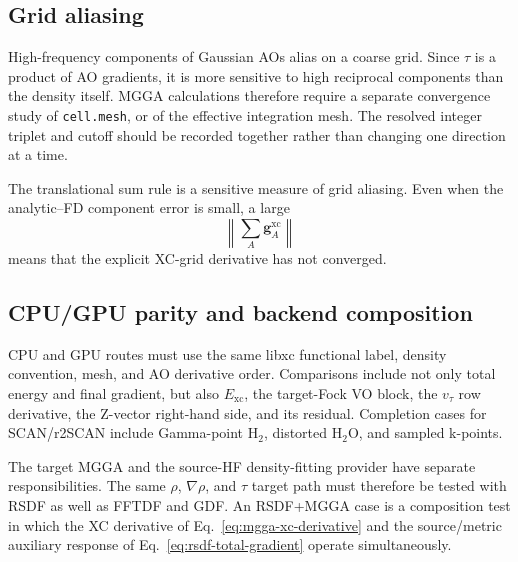 \subsection{Grid aliasing}

High-frequency components of Gaussian AOs alias on a coarse grid.  Since
$\tau$ is a product of AO gradients, it is more sensitive to high reciprocal
components than the density itself.  MGGA calculations therefore require a
separate convergence study of \texttt{cell.mesh}, or of the effective
integration mesh.  The resolved integer triplet and cutoff should be recorded
together rather than changing one direction at a time.

The translational sum rule is a sensitive measure of grid aliasing.  Even when
the analytic--FD component error is small, a large
\begin{equation}
  \left\|\sum_A\mathbf g_A^{\mathrm{xc}}\right\|
  \label{eq:mgga-xc-translation}
\end{equation}
means that the explicit XC-grid derivative has not converged.

\subsection{CPU/GPU parity and backend composition}

CPU and GPU routes must use the same libxc functional label, density
convention, mesh, and AO derivative order.  Comparisons include not only total
energy and final gradient, but also $E_{\mathrm{xc}}$, the target-Fock VO
block, the $v_\tau$ row derivative, the Z-vector right-hand side, and its
residual.  Completion cases for SCAN/r2SCAN include Gamma-point H$_2$,
distorted H$_2$O, and sampled k-points.

The target MGGA and the source-HF density-fitting provider have separate
responsibilities.  The same $\rho$, $\nabla\rho$, and $\tau$ target path must
therefore be tested with RSDF as well as FFTDF and GDF.  An RSDF+MGGA case is a
composition test in which the XC derivative of
Eq.~\eqref{eq:mgga-xc-derivative} and the source/metric auxiliary response of
Eq.~\eqref{eq:rsdf-total-gradient} operate simultaneously.
